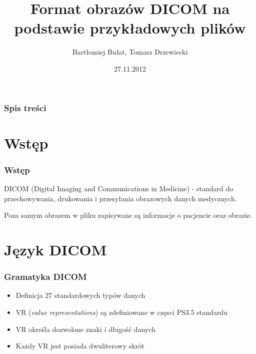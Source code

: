 \documentclass{beamer}
\title[DICOM]{Format obrazów DICOM na podstawie przykładowych plików}
\author[B. Bułat, T. Drzewiecki]{Bartłomiej Bułat, Tomasz Drzewiecki}
\date[2012]{27.11.2012}
\institute[AGH]
{Wydział EAIiIB\\ 
Katedra Automatyki
}
\begin{document}
{
 \begin{frame}
   \titlepage
 \end{frame}
}


\begin{frame}
  \frametitle{Spis treści}
  \tableofcontents
\end{frame}

\newcommand{\nextoc}{ \begin{frame}\frametitle{Spis treści}\tableofcontents[hidesubsections]\end{frame}}


\section{Wstęp}
\begin{frame}
    \frametitle{Wstęp}
    DICOM (Digital Imaging and Communications in Medicine) - standard do przechowywania, drukowania i przesyłania obrazowych danych medycznych.

    Poza samym obrazem w pliku zapisywane są informacje o pacjencie oraz obrazie.

\end{frame}

\section{Język DICOM}
\begin{frame}
    \frametitle{Gramatyka DICOM}
\begin{itemize}
  \item Definicja 27 standardowych typów danych
  \item VR (\emph{value representations}) są zdefiniowane w częsci PS3.5 standardu
  \item VR określa dozwolone znaki i długość danych
  \item Każdy VR jest posiada dwuliterowy skrót
\end{itemize}
\end{frame}
\end{document}
